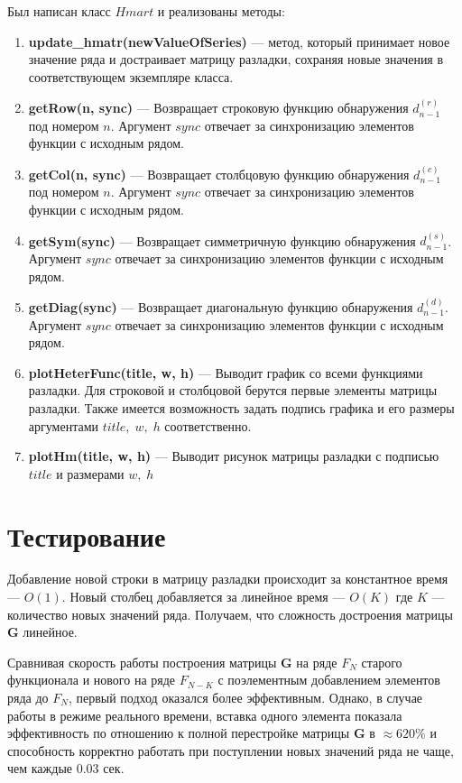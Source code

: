 \documentclass[specialist, substylefile = spbu.rtx,
			   subf, href, 12pt]{disser}
\begin{document}
Был написан класс $Hmart$ и реализованы методы:
\begin{enumerate}
	\item
	\textbf{update\_hmatr(newValueOfSeries)} --- метод, который принимает новое значение ряда и достраивает матрицу разладки, сохраняя новые значения в соответствующем экземпляре класса.
	\item
	\textbf{getRow(n,\; sync)} --- Возвращает строковую функцию обнаружения $d_{n-1}^{(r)}$ под номером $n$. Аргумент $sync$ отвечает за синхронизацию элементов функции с исходным рядом.
	\item
	\textbf{getCol(n,\; sync)} --- Возвращает столбцовую функцию обнаружения $d_{n-1}^{(c)}$ под номером $n$. Аргумент $sync$ отвечает за синхронизацию элементов функции с исходным рядом.
	\item
	\textbf{getSym(sync)} --- Возвращает симметричную функцию обнаружения $d_{n-1}^{(s)}$. Аргумент $sync$ отвечает за синхронизацию элементов функции с исходным рядом.
	\item
	\textbf{getDiag(sync)} --- Возвращает диагональную функцию обнаружения $d_{n-1}^{(d)}$. Аргумент $sync$ отвечает за синхронизацию элементов функции с исходным рядом.
	\item
	\textbf{plotHeterFunc(title,\; w,\; h)} --- Выводит график со всеми функциями разладки. Для строковой и столбцовой берутся первые элементы матрицы разладки. Также имеется возможность задать подпись графика и его размеры аргументами $title,\; w,\; h$ соответственно.
	\item
	\textbf{plotHm(title,\; w,\; h)} --- Выводит рисунок матрицы разладки с подписью $title$ и размерами $w,\; h$
\end{enumerate}

\section{Тестирование}
Добавление новой строки в матрицу разладки происходит за константное время --- $O(1)$. Новый столбец добавляется за линейное время --- $O(K)$ где $K$ --- количество новых значений ряда. Получаем, что сложность достроения матрицы $ \mathbf{G} $ линейное. 

Сравнивая скорость работы построения матрицы $ \mathbf{G} $ на ряде $F_{N}$ старого функционала и нового на ряде $F_{N-K}$ с поэлементным добавлением элементов ряда до $F_{N}$, первый подход оказался более эффективным. Однако, в случае работы в режиме реального времени, вставка одного элемента показала эффективность по отношению к полной перестройке матрицы  $ \mathbf{G} $ в $\approx 620\%$ и способность корректно работать при поступлении новых значений ряда не чаще, чем каждые $0.03$ сек.
\end{document}
